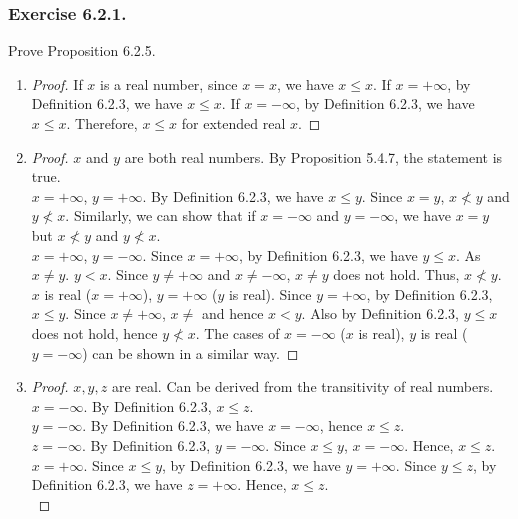 \documentclass[12pt, letter]{article}
\begin{document}
\subsubsection*{Exercise 6.2.1.}
Prove Proposition 6.2.5.
\begin{enumerate}[label=(\alph*)]
    \item \begin{proof}
        If $x$ is a real number, since $x=x$, we have $x\leq x$. If $x=+\infty$, by Definition 6.2.3, we have $x\leq x$. If $x=-\infty$, by Definition 6.2.3, we have $x\leq x$.
        Therefore, $x\leq x$ for extended real $x$.
    \end{proof}
    \item \begin{proof}
        $x$ and $y$ are both real numbers. By Proposition 5.4.7, the statement is true. \\
        $x=+\infty$, $y=+\infty$. By Definition 6.2.3, we have $x\leq y$. Since $x=y$, $x\nless y$ and $y\nless x$. Similarly, we can show that if $x=-\infty$ and $y=-\infty$,
        we have $x=y$ but $x\nless y$ and $y\nless x$.\\
        $x=+\infty$, $y=-\infty$. Since $x=+\infty$, by Definition 6.2.3, we have $y\leq x$. As $x\ne y$. $y<x$. Since $y\ne +\infty$ and $x\ne -\infty$, $x\ne y$ does not hold.
        Thus, $x\nless y$.\\
        $x$ is real ($x=+\infty$), $y=+\infty$ ($y$ is real). Since $y=+\infty$, by Definition 6.2.3, $x\leq y$. Since $x\ne +\infty$, $x\ne$ and hence $x<y$. Also by Definition 6.2.3,
        $y\leq x$ does not hold, hence $y\nless x$. The cases of $x=-\infty$ ($x$ is real), $y$ is real ($y=-\infty$) can be shown in a similar way.
    \end{proof}
    \item \begin{proof}
        $x,y,z$ are real. Can be derived from the transitivity of real numbers.\\
        $x=-\infty$. By Definition 6.2.3, $x\leq z$.\\
        $y=-\infty$. By Definition 6.2.3, we have $x=-\infty$, hence $x\leq z$.\\
        $z=-\infty$. By Definition 6.2.3, $y=-\infty$. Since $x\leq y$, $x=-\infty$. Hence, $x\leq z$.\\
        $x=+\infty$. Since $x\leq y$, by Definition 6.2.3, we have $y=+\infty$. Since $y\leq z$, by Definition 6.2.3, we have $z=+\infty$. Hence, $x\leq z$.\\

\end{proof}
\end{enumerate}
\end{document}
